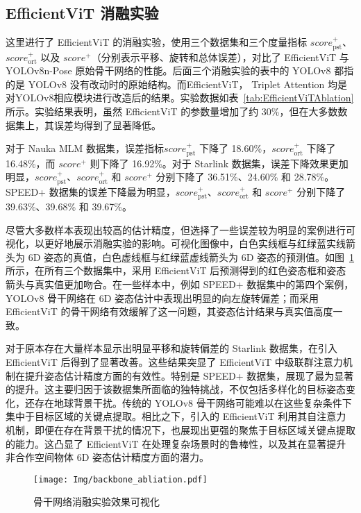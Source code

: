 \subsection{EfficientViT 消融实验}
这里进行了 EfficientViT 的消融实验，使用三个数据集和三个度量指标 $score_{\text{pst}}^+$、$score_{\text{ort}}^+$ 以及 $score^+$（分别表示平移、旋转和总体误差），对比了 EfficientViT 与 YOLOv8n-Pose 原始骨干网络的性能。后面三个消融实验的表中的 YOLOv8 都指的是 YOLOv8 没有改动时的原始结构。而EfficientViT， Triplet Attention 均是对YOLOv8相应模块进行改造后的结果。实验数据如表~\ref{tab:EfficientViTAblation} 所示。实验结果表明，虽然 EfficientViT 的参数量增加了约 30\%，但在大多数数据集上，其误差均得到了显著降低。

对于 Nauka MLM 数据集，误差指标$score_{\text{pst}}^+$ 下降了 18.60\%，$score_{\text{ort}}^+$ 下降了 16.48\%，而 $score^+$ 则下降了 16.92\%。对于 Starlink 数据集，误差下降效果更加明显，$score_{\text{pst}}^+$、$score_{\text{ort}}^+$ 和 $score^+$ 分别下降了 36.51\%、24.60\% 和 28.78\%。SPEED+ 数据集的误差下降最为明显，$score_{\text{pst}}^+$、$score_{\text{ort}}^+$ 和 $score^+$ 分别下降了 39.63\%、39.68\% 和 39.67\%。

尽管大多数样本表现出较高的估计精度，但选择了一些误差较为明显的案例进行可视化，以更好地展示消融实验的影响。可视化图像中，白色实线框与红绿蓝实线箭头为 6D 姿态的真值，白色虚线框与红绿蓝虚线箭头为 6D 姿态的预测值。如图~\ref{fig:backbone_abliation} 所示，在所有三个数据集中，采用 EfficientViT 后预测得到的红色姿态框和姿态箭头与真实值更加吻合。在一些样本中，例如 SPEED+ 数据集中的第四个案例，YOLOv8 骨干网络在 6D 姿态估计中表现出明显的向左旋转偏差；而采用  EfficientViT 的骨干网络有效缓解了这一问题，其姿态估计结果与真实值高度一致。

对于原本存在大量样本显示出明显平移和旋转偏差的 Starlink 数据集，在引入 EfficientViT 后得到了显著改善。这些结果突显了 EfficientViT 中级联群注意力机制在提升姿态估计精度方面的有效性。特别是 SPEED+ 数据集，展现了最为显著的提升。这主要归因于该数据集所面临的独特挑战，不仅包括多样化的目标姿态变化，还存在地球背景干扰。传统的 YOLOv8 骨干网络可能难以在这些复杂条件下集中于目标区域的关键点提取。相比之下，引入的 EfficientViT 利用其自注意力机制，即便在存在背景干扰的情况下，也展现出更强的聚焦于目标区域关键点提取的能力。这凸显了 EfficientViT 在处理复杂场景时的鲁棒性，以及其在显著提升非合作空间物体 6D 姿态估计精度方面的潜力。

\begin{figure}[htbp]
	\centering
	\texttt{[image: Img/backbone\_abliation.pdf]}
	\caption{骨干网络消融实验效果可视化}
	\label{fig:backbone_abliation}
	\vspace{-49pt}
\end{figure}


